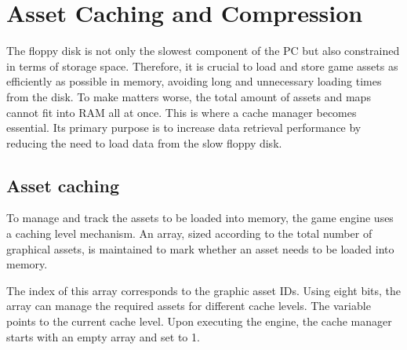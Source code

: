 \documentclass[book.tex]{subfiles}
\begin{document}
\section{Asset Caching and Compression}
\label{section:cache_compression}

The floppy disk is not only the slowest component of the PC but also constrained in terms of storage space. Therefore, it is crucial to load and store game assets as efficiently as possible in memory, avoiding long and unnecessary loading times from the disk. To make matters worse, the total amount of assets and maps cannot fit into RAM all at once. This is where a cache manager becomes essential. Its primary purpose is to increase data retrieval performance by reducing the need to load data from the slow floppy disk. 

\subsection{Asset caching}
To manage and track the assets to be loaded into memory, the game engine uses a caching level mechanism. An array, sized according to the total number of graphical assets, is maintained to mark whether an asset needs to be loaded into memory. \\

 
\par
The index of this array corresponds to the graphic asset IDs. Using eight bits, the array can manage the required assets for different cache levels. The  variable points to the current cache level. Upon executing the engine, the cache manager starts with an empty array and  set to 1.\\
\end{document}
